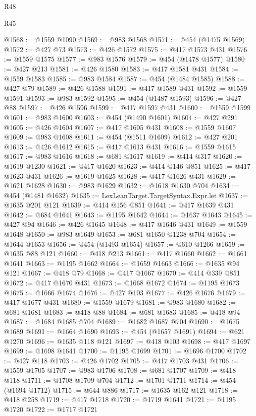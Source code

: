 \begin{lexlean}{R48}
\begin{lexlean}{R45}
\begin{coremodule}
{{{{{{{{{{{{{{{{{{{{{{{{{{{{{{{{{{{{{{{{{{{{{{{{{{{{{{{{{{{{{{{{{{{{{{{{{{{{{{{{{{{{{{{{{{{@1568 := @1559 @1090
@1569 := @983 @1568
@1571 := @454 (@1475 @1569)
@1572 := @427 @73
@1573 := @426 @1572
@1575 := @417 @1573 @431
@1576 := @1559 @1575
@1577 := @983 @1576
@1579 := @454 (@1478 @1577)
@1580 := @427 @213
@1581 := @426 @1580
@1583 := @417 @1581 @431
@1584 := @1559 @1583
@1585 := @983 @1584
@1587 := @454 (@1484 @1585)
@1588 := @427 @79
@1589 := @426 @1588
@1591 := @417 @1589 @431
@1592 := @1559 @1591
@1593 := @983 @1592
@1595 := @454 (@1487 @1593)
@1596 := @427 @88
@1597 := @426 @1596
@1599 := @417 @1597 @431
@1600 := @1559 @1599
@1601 := @983 @1600
@1603 := @454 (@1490 @1601)
@1604 := @427 @291
@1605 := @426 @1604
@1607 := @417 @1605 @431
@1608 := @1559 @1607
@1609 := @983 @1608
@1611 := @454 (@1511 @1609)
@1612 := @427 @201
@1613 := @426 @1612
@1615 := @417 @1613 @431
@1616 := @1559 @1615
@1617 := @983 @1616
@1618 := @681 @1617
@1619 := @414 @317
@1620 := @1619 @1230
@1621 := @417 @1620
@1623 := @414 @146 @851
@1625 := @417 @1623 @431
@1626 := @1619 @1625
@1628 := @417 @1626 @431
@1629 := @1621 @1628
@1630 := @983 @1629
@1632 := @1618 @1630 @704
@1634 := @454 (@1481 @1632)
@1635 := LexLeanTarget.TargetSyntax.Expr.let
@1637 := @1635 @201 @121
@1639 := @414 @156 @851
@1641 := @417 @1639 @431
@1642 := @684 @1641
@1643 := @1195 @1642
@1644 := @1637 @1643
@1645 := @427 @94
@1646 := @426 @1645
@1648 := @417 @1646 @431
@1649 := @1559 @1648
@1650 := @983 @1649
@1653 := @681 @1650 @1238 @704
@1654 := @1644 @1653
@1656 := @454 (@1493 @1654)
@1657 := @610 @1266
@1659 := @1635 @88 @121
@1660 := @418 @213
@1661 := @417 @1660
@1662 := @1661 @1641
@1663 := @1195 @1662
@1664 := @1659 @1663
@1666 := @1635 @94 @121
@1667 := @418 @79
@1668 := @417 @1667
@1670 := @414 @339 @851
@1672 := @417 @1670 @431
@1673 := @1668 @1672
@1674 := @1195 @1673
@1675 := @1666 @1674
@1676 := @427 @103
@1677 := @426 @1676
@1679 := @417 @1677 @431
@1680 := @1559 @1679
@1681 := @983 @1680
@1682 := @681 @1681
@1683 := @418 @88
@1684 := @681 @1683
@1685 := @418 @94
@1687 := @1684 @1685 @704
@1689 := @1682 @1687 @704
@1690 := @1675 @1689
@1691 := @1664 @1690
@1693 := @454 (@1657 @1691)
@1694 := @621 @1270
@1696 := @1635 @118 @121
@1697 := @418 @103
@1698 := @417 @1697
@1699 := @1698 @1641
@1700 := @1195 @1699
@1701 := @1696 @1700
@1702 := @427 @118
@1703 := @426 @1702
@1705 := @417 @1703 @431
@1706 := @1559 @1705
@1707 := @983 @1706
@1708 := @681 @1707
@1709 := @418 @118
@1711 := @1708 @1709 @704
@1712 := @1701 @1711
@1714 := @454 (@1694 @1712)
@1715 := @644 @886
@1717 := @1635 @162 @121
@1718 := @418 @258
@1719 := @417 @1718
@1720 := @1719 @1641
@1721 := @1195 @1720
@1722 := @1717 @1721
}}}}}}}}}}}}}}}}}}}}}}}}}}}}}}}}}}}}}}}}}}}}}}}}}}}}}}}}}}}}}}}}}}}}}}}}}}}}}}}}}}}}}}}}}}}
\end{coremodule}
\end{lexlean}
\end{lexlean}
